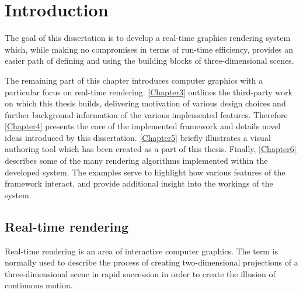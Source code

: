 
\chapter{ Introduction }
\label{Chapter1}

The goal of this dissertation is to develop a real-time graphics rendering system which, while making no compromises in terms of run-time efficiency, provides an easier path of defining and using the building blocks of three-dimensional scenes.

The remaining part of this chapter introduces computer graphics with a particular focus on real-time rendering. \cref{Chapter3} outlines the third-party work on which this thesis builds, delivering motivation of various design choices and further background information of the various implemented features. Therefore \cref{Chapter4} presents the core of the implemented framework and details novel ideas introduced by this dissertation. \cref{Chapter5} briefly illustrates a visual authoring tool which has been created as a part of this thesis. Finally, \cref{Chapter6} describes some of the many rendering algorithms implemented within the developed system. The examples serve to highlight how various features of the framework interact, and provide additional insight into the workings of the system.

\section{Real-time rendering}

Real-time rendering is an area of interactive computer graphics. The term is normally used to describe the process of creating two-dimensional projections of a three-dimensional scene in rapid succession in order to create the illusion of continuous motion.

